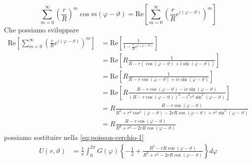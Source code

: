\begin{dimostrazione}
    \begin{equation*}
        \sum\limits ^{\infty }_{m=0}\left(\frac{r}{R}\right)^{m}\cos m(\varphi -\vartheta) =\mathrm{Re}\left[\sum\limits ^{\infty }_{m=0}\left(\frac{r}{R} e^{i(\varphi -\vartheta)}\right)^{m}\right]
    \end{equation*}
    Che possiamo sviluppare
    \begin{align*}
        \mathrm{Re}\left[\sum\limits ^{\infty }_{m=0}\left(\frac{r}{R} e^{i(\varphi -\vartheta)}\right)^{m}\right] & =\mathrm{Re}\left[\frac{1}{1-\frac{r}{R} e^{i(\varphi -\vartheta)}}\right]                                                                                            \\
                                                                                                                   & =\mathrm{Re}\left[ R\frac{1}{R-r(\cos(\varphi -\vartheta) +i\sin(\varphi -\vartheta))}\right]                                                                         \\
                                                                                                                   & =\mathrm{Re}\left[ R\frac{1}{R-r\cos(\varphi -\vartheta) +ir\sin(\varphi -\vartheta)}\right]                                                                          \\
                                                                                                                   & =\mathrm{Re}\left[ R\frac{R-r\cos(\varphi -\vartheta) -ir\sin(\varphi -\vartheta)}{(R-r\cos(\varphi -\vartheta))^{2} -i^{2} r^{2}\sin^{2}(\varphi -\vartheta)}\right] \\
                                                                                                                   & =R\frac{R-r\cos(\varphi -\vartheta)}{R^{2} +r^{2}\cos^{2}(\varphi -\vartheta) -2rR\cos(\varphi -\vartheta) +r^{2}\sin^{2}(\varphi -\vartheta)}                        \\
                                                                                                                   & =R\frac{R-r\cos(\varphi -\vartheta)}{R^{2} +r^{2} -2rR\cos(\varphi -\vartheta)}
    \end{align*}
    possiamo sostituire nella \eqref{eq:poisson-cerchio-1}
    \begin{align*}
        U(r,\vartheta) & =\frac{1}{\pi }\int ^{2\pi }_{0} G(\varphi)\left\{-\frac{1}{2} +\frac{R^{2} -rR\cos(\varphi -\vartheta)}{R^{2} +r^{2} -2rR\cos(\varphi -\vartheta)}\right\} d\varphi                                                            \\

\end{align*}
\end{dimostrazione}
